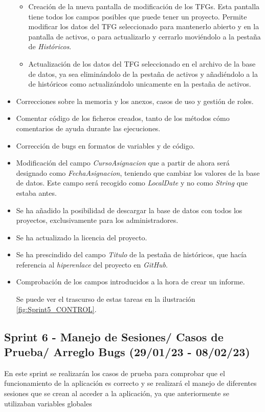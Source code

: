 \begin{itemize}
\begin{itemize}
		\item Creación de la nueva pantalla de modificación de los TFGs. Esta pantalla tiene todos los campos posibles que puede tener un proyecto. Permite modificar los datos del TFG seleccionado para mantenerlo abierto y en la pantalla de activos, o para actualizarlo y cerrarlo moviéndolo a la pestaña de \emph{Históricos}.
		\item Actualización de los datos del TFG seleccionado en el archivo de la base de datos, ya sea eliminándolo de la pestaña de activos y añadiéndolo a la de históricos como actualizándolo unicamente en la pestaña de activos.
	\end{itemize}
	\item Correcciones sobre la memoria y los anexos, casos de uso y gestión de roles.
	\item Comentar código de los ficheros creados, tanto de los métodos cómo comentarios de ayuda durante las ejecuciones.
	\item Corrección de bugs en formatos de variables y de código.
	\item Modificación del campo \emph{CursoAsignacion} que a partir de ahora será designado como \emph{FechaAsignacion}, teniendo que cambiar los valores de la base de datos. Este campo será recogido como \emph{LocalDate} y no como \emph{String} que estaba antes.
	\item Se ha añadido la posibilidad de descargar la base de datos con todos los proyectos, exclusivamente para los administradores.
	\item Se ha actualizado la licencia del proyecto.
	\item Se ha prescindido del campo \emph{Titulo} de la pestaña de históricos, que hacía referencia al \emph{hiperenlace} del proyecto en  \emph{GitHub}.
	\item Comprobación de los campos introducidos a la hora de crear un informe. 
	
	Se puede ver el trascurso de estas tareas en la ilustración \ref{fig:Sprint5_CONTROL}.
	
\end{itemize}

\subsection{Sprint 6 - Manejo de Sesiones/ Casos de Prueba/ Arreglo Bugs (29/01/23 - 08/02/23) }

En este sprint se realizarán los casos de prueba para comprobar que el funcionamiento de la aplicación es correcto y se realizará el manejo de diferentes sesiones que se crean al acceder a la aplicación, ya que anteriormente se utilizaban variables globales

